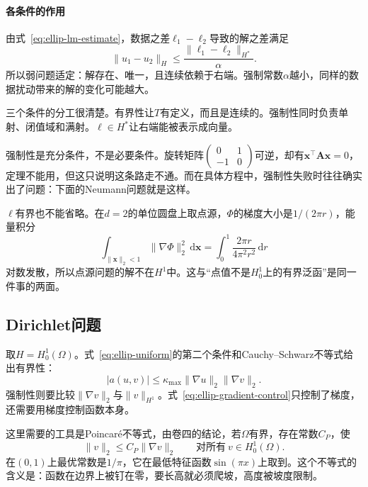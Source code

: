 \paragraph{各条件的作用}
由式~\eqref{eq:ellip-lm-estimate}，数据之差$\ell_1-\ell_2$导致的解之差满足
\begin{equation}
 \lVert u_1-u_2\rVert_H\leq\frac{\lVert\ell_1-\ell_2\rVert_{H^*}}{\alpha}.
 \label{eq:ellip-lm-stability}
\end{equation}
所以弱问题适定：解存在、唯一，且连续依赖于右端。强制常数$\alpha$越小，同样的数据扰动带来的解的变化可能越大。

三个条件的分工很清楚。有界性让$T$有定义，而且是连续的。强制性同时负责单射、闭值域和满射。$\ell\in H^*$让右端能被表示成向量。

强制性是充分条件，不是必要条件。旋转矩阵$\begin{pmatrix}0&1\\-1&0\end{pmatrix}$可逆，却有$\bm{x}^\top\bm{A}\bm{x}=0$，定理不能用，但这只说明这条路走不通。而在具体方程中，强制性失败时往往确实出了问题：下面的Neumann问题就是这样。

$\ell$有界也不能省略。在$d=2$的单位圆盘上取点源，$\Phi$的梯度大小是$1/(2\pi r)$，能量积分
\[
 \int_{\lVert\bm{x}\rVert_2<1}\lVert\nabla\Phi\rVert_2^2\,\mathrm{d}\bm{x}=\int_0^1\frac{2\pi r}{4\pi^2r^2}\,\mathrm{d}r
\]
对数发散，所以点源问题的解不在$H^1$中。这与“点值不是$H^1_0$上的有界泛函”是同一件事的两面。

\subsection{Dirichlet问题}
\label{sec:ellip-dirichlet}

取$H=H^1_0(\Omega)$。式~\eqref{eq:ellip-uniform}的第二个条件和Cauchy--Schwarz不等式给出有界性：
\[
 \lvert a(u,v)\rvert\leq\kappa_{\max}\lVert\nabla u\rVert_2\lVert\nabla v\rVert_2 .
\]
强制性则要比较$\lVert\nabla v\rVert_2$与$\lVert v\rVert_{H^1}$。式~\eqref{eq:ellip-gradient-control}只控制了梯度，还需要用梯度控制函数本身。

这里需要的工具是Poincaré不等式，由卷四的结论，若$\Omega$有界，存在常数$C_P$，使
\begin{equation}
 \lVert v\rVert_2\leq C_P\lVert\nabla v\rVert_2\qquad\text{对所有}\ v\in H^1_0(\Omega).
 \label{eq:ellip-poincare}
\end{equation}
在$(0,1)$上最优常数是$1/\pi$，它在最低特征函数$\sin(\pi x)$上取到。这个不等式的含义是：函数在边界上被钉在零，要长高就必须爬坡，高度被坡度限制。


